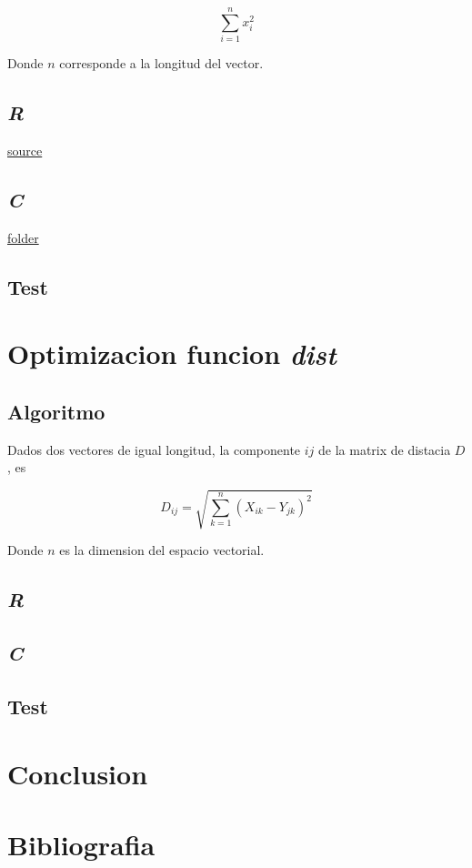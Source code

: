 \documentclass{article}
\begin{document}
    \begin{equation*}
        \sum_{i = 1}^{n} x_{i}^{2}
    \end{equation*}
    
    Donde $n$ corresponde a la longitud del vector.

    \subsection{\textit{R}}

    \href{https://github.com/eyeshield-06/Trabajo-C3/blob/master/source/exercise2/a/function.R}{source}

    \subsection{\textit{C}}

    \href{https://github.com/eyeshield-06/Trabajo-C3/tree/master/source/exercise2/b}{folder}

    \subsection{Test}
    
    \section{Optimizacion funcion \textit{dist}}

    \subsection{Algoritmo}

    Dados dos vectores de igual longitud, la componente $ij$ de la matrix de distacia  $D$, es

    \begin{equation*}
        D_{ij} = \sqrt{ \sum_{k = 1}^{n} (X_{ik} - Y_{jk})^2 }
    \end{equation*}

    Donde $n$ es la dimension del espacio vectorial.
    
    \subsection{\textit{R}}
    
    \subsection{\textit{C}}

    \subsection{Test}
    
    \section{Conclusion}

    \section{Bibliografia}
\end{document}
